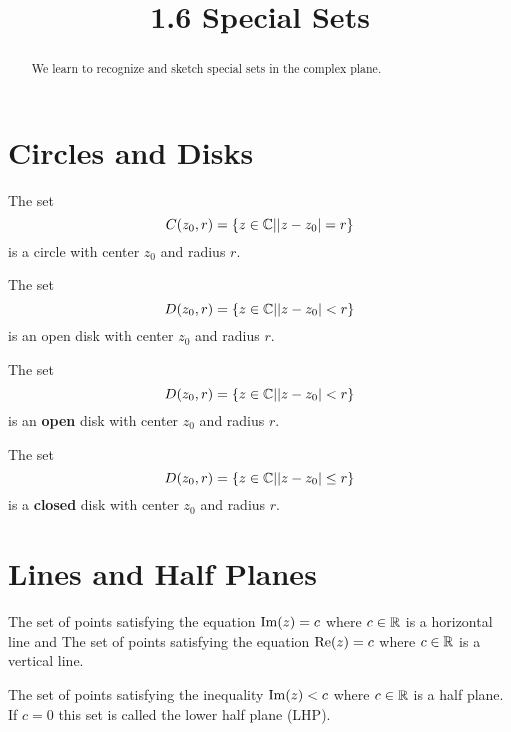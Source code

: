 \documentclass[handout]{ximera}
\title{1.6 Special Sets}
\begin{document}
\begin{abstract}
We learn to recognize and sketch special sets in the complex plane.
\end{abstract}

\maketitle

\section{Circles and Disks}

\begin{example}[example 1]
The set 
\[
C(z_0,r) = \{z\in \mathbb C | |z-z_0| =r \}
\]
is a circle with center $z_0$ and radius $r$.
\end{example}


\begin{example}[example 2]
The set 
\[
D(z_0,r) = \{z\in \mathbb C | |z-z_0| <r \}
\]
is an open disk with center $z_0$ and radius $r$.
\end{example}


\begin{example}[example 2]
The set 
\[
D(z_0,r) = \{z\in \mathbb C | |z-z_0| <r \}
\]
is an {\bf open} disk with center $z_0$ and radius $r$.
\end{example}


\begin{example}[example 3]
The set 
\[
D(z_0,r) = \{z\in \mathbb C | |z-z_0| \leq r \}
\]
is a {\bf closed} disk with center $z_0$ and radius $r$.
\end{example}


\section{Lines and Half Planes}

\begin{example}[example 4]
The set of points satisfying the equation $\operatorname{Im}(z) = c$ where $c \in \mathbb R$ is a horizontal line and
The set of points satisfying the equation $\operatorname{Re}(z) = c$ where $c \in \mathbb R$ is a vertical line.

\end{example}


\begin{example}[example 5]
The set of points satisfying the inequality $\operatorname{Im}(z) < c$ where $c \in \mathbb R$ is a
half plane. If $c=0$ this set is called the lower half plane (LHP).
\end{example}
\end{document}
